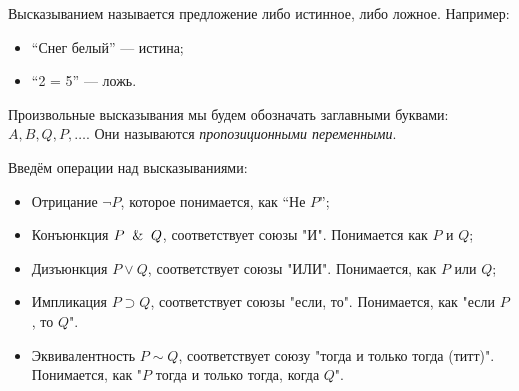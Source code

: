 \begin{definition}
  Высказыванием называется предложение либо истинное, либо ложное. Например:
  \begin{itemize}
    \item ``Снег белый'' --- истина;
    \item ``2  = 5'' --- ложь.
  \end{itemize}

  Произвольные высказывания мы будем обозначать заглавными буквами:
  $A, B, Q, P, \dots$. Они называются \emph{пропозиционными
  переменными}.
\end{definition}

Введём операции над высказываниями:
\begin{itemize}
  \item Отрицание $\neg P$, которое понимается, как ``Не $P$'';
  \item Конъюнкция $P \And Q$, соответствует союзы "И". Понимается
    как $P$ и $Q$;
  \item  Дизъюнкция $P \vee Q$, соответствует союзы "ИЛИ".
    Понимается, как $P$ или $Q$;
  \item Импликация $P \supset Q$, соответствует союзы "если, то".
    Понимается, как "если $P$, то $Q$".
  \item Эквивалентность $P \sim Q$, соответствует союзу "тогда и
    только тогда (титт)". Понимается, как "$P$ тогда и только тогда,
    когда $Q$".
\end{itemize}
